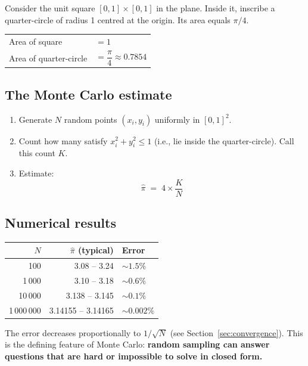 \documentclass[11pt, a4paper]{article}
\begin{document}
Consider the unit square $[0,1]\times[0,1]$ in the plane. Inside it, inscribe a quarter-circle of radius 1 centred at the origin. Its area equals $\pi/4$.

\begin{center}
\begin{tabular}{ll}
  Area of square & $= 1$ \\
  Area of quarter-circle & $= \dfrac{\pi}{4} \approx 0.7854$ \\
\end{tabular}
\end{center}

\subsection*{The Monte Carlo estimate}

\begin{enumerate}[leftmargin=2em]
  \item Generate $N$ random points $(x_i, y_i)$ uniformly in $[0,1]^2$.
  \item Count how many satisfy $x_i^2 + y_i^2 \leq 1$ (i.e., lie inside the quarter-circle). Call this count $K$.
  \item Estimate:
  \[
    \hat\pi \;=\; 4 \times \frac{K}{N}
  \]
\end{enumerate}

\subsection*{Numerical results}

\begin{center}
\begin{tabular}{rrl}
  \toprule
  $N$ & $\hat\pi$ (typical) & Error \\
  \midrule
  100       & 3.08 -- 3.24 & $\sim 1.5\%$ \\
  1\,000    & 3.10 -- 3.18 & $\sim 0.6\%$ \\
  10\,000   & 3.138 -- 3.145 & $\sim 0.1\%$ \\
  1\,000\,000 & 3.14155 -- 3.14165 & $\sim 0.002\%$ \\
  \bottomrule
\end{tabular}
\end{center}

The error decreases proportionally to $1/\sqrt{N}$ (see Section~\ref{sec:convergence}). This is the defining feature of Monte Carlo: \textbf{random sampling can answer questions that are hard or impossible to solve in closed form.}
\end{document}
